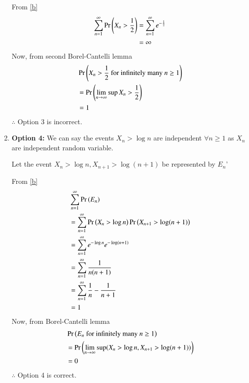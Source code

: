 \documentclass[journal,12pt,twocolumn]{IEEEtran}
\begin{document}
\begin{enumerate}
    From \eqref{b}
    \begin{align}
        \sum_{n=1}^{\infty}\Pr\left(X_n > \frac{1}{2}\right) &= \sum_{n=1}^{\infty}e^{-\frac{1}{2}}\nonumber\\
                                            &= \infty\nonumber
    \end{align}
    Now, from second Borel-Cantelli lemma
    \begin{align}
        &\Pr\left(X_n>\frac{1}{2} \text{ for infinitely many }n\geq1\right)\nonumber\\
        &=\Pr\left(\lim_{n \rightarrow \infty}\sup X_n>\frac{1}{2}\right)\nonumber\\
        &=1\nonumber
    \end{align}
    $\therefore$ Option 3 is incorrect.
    \item \textbf{Option 4:} We can say the events $X_n>\log n$ are independent $\forall n\geq 1$ as $X_n$ are independent random variable.
    
    Let the event $X_n > \log n,X_{n+1}>\log (n+1)$ be represented by $E_n$'
    
    From \eqref{b}
    \begin{align}
        &\sum_{n=1}^{\infty}\Pr\left(E_n\right)\nonumber\\
        &= \sum_{n=1}^{\infty}\Pr\left(X_n>\log n\right)\Pr\left(X_{n+1}>\log (n+1)\right)\nonumber\\
        &=\sum_{n=1}^{\infty}e^{-\log n}e^{-\log (n+1)}\nonumber\\
        &=\sum_{n=1}^{\infty}\frac{1}{n(n+1)}\nonumber\\
        &=\sum_{n=1}^{\infty}\frac{1}{n}-\frac{1}{n+1}\nonumber\\
        &=1
    \end{align}
    Now, from Borel-Cantelli lemma
    \begin{align}
        &\Pr\left(E_n\text{ for infinitely many }n\geq1\right)\nonumber\\
        &=\Pr\left(\lim_{n \rightarrow \infty}\sup ( X_n>\log n,X_{n+1}>\log (n+1))\right)\nonumber\\
        &=0\nonumber
    \end{align}
    $\therefore$ Option 4 is correct.
\end{enumerate}
\vspace{0.5cm}\centering {}
\end{document}
